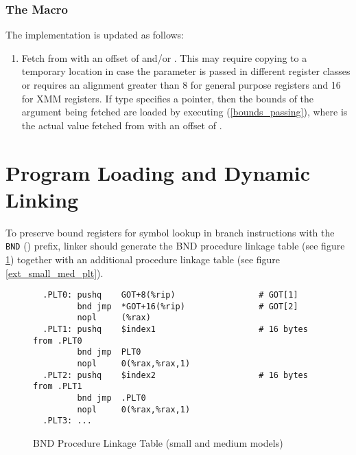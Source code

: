 \subsubsection{The  Macro}

The  implementation is updated as follows:

\begin{enumerate}
\item
  Fetch  from  with an offset of
   and/or .  This may require
  copying to a temporary location in case the parameter is passed in
  different register classes or requires an alignment greater than 8 for
  general purpose registers and 16 for XMM registers.  If type specifies
  a pointer, then the bounds of the argument being fetched are loaded
  by executing 
  (\ref{bounds_passing}), where  is the actual value fetched from
   with an offset of .
\end{enumerate}

\section{Program Loading and Dynamic Linking}

To preserve bound registers for symbol lookup in branch instructions
with the \texttt{BND} () prefix, linker should generate the
BND procedure linkage table (see figure \ref{bnd_small_med_plt}) together
with an additional procedure linkage table (see figure
\ref{ext_small_med_plt}).

\begin{figure}[H]
\Hrule
\caption{BND Procedure Linkage Table (small and medium models)}
\label{bnd_small_med_plt}
\begin{footnotesize}
\begin{verbatim}
  .PLT0: pushq    GOT+8(%rip)                 # GOT[1]
         bnd jmp  *GOT+16(%rip)               # GOT[2]
         nopl     (%rax)
  .PLT1: pushq    $index1                     # 16 bytes from .PLT0
         bnd jmp  PLT0
         nopl     0(%rax,%rax,1)
  .PLT2: pushq    $index2                     # 16 bytes from .PLT1
         bnd jmp  .PLT0
         nopl     0(%rax,%rax,1)
  .PLT3: ...
\end{verbatim}%
\end{footnotesize}
\Hrule
\end{figure}

